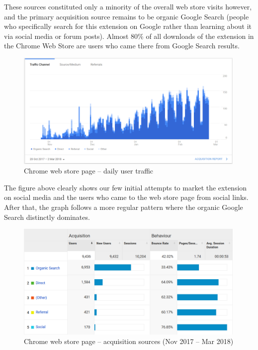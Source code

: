 \documentclass[bsc,frontabs,twoside,singlespacing,parskip,deptreport]{infthesis}
\begin{document}
These sources constituted only a minority of the overall web store visits however, and the primary acquisition source remains to be organic Google Search (people who specifically search for this extension on Google rather than learning about it via social media or forum posts). Almost 80\% of all downloads of the extension in the Chrome Web Store are users who came there from Google Search results.

\begin{figure}[h]
\centering
\includegraphics[width=0.99\textwidth]{../docs/user-acquisition.png}
\caption{Chrome web store page -- daily user traffic}
\end{figure}

The figure above clearly shows our few initial attempts to market the extension on social media and the users who came to the web store page from social links. After that, the graph follows a more regular pattern where the organic Google Search distinctly dominates.

\begin{figure}[h]
\centering
\includegraphics[width=0.99\textwidth]{../docs/user-acquisition-sources.png}
\caption{Chrome web store page -- acquisition sources (Nov 2017 -- Mar 2018)}
\end{figure}
\end{document}
